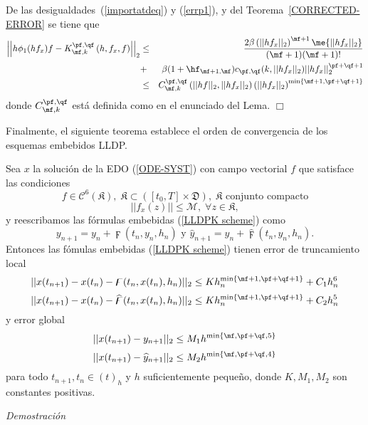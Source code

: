 De las desigualdades~(\ref{importatdeq}) y (\ref{errp1}), y del  Teorema~\ref{CORRECTED-ERROR} se tiene que
\begin{eqnarray*}
\left\lvert\left\lvert  h\phi_1(hf_x)f-  K_{\mf,k}^{\pf,\qf}\left( h,  f_x , f \right)\right\rvert\right\rvert_2
&\leq& \frac{2\beta \left( \vert\lvert hf_x\rvert\rvert_2 \right)^{\mf+1}
    \me{\lvert\lvert hf_x\rvert\rvert_2}}{(\mf+1)(\mf+1)!}\\
&+&
\beta(1+\hf_{\mf+1,\mf})c_{\pf,\qf}(k,\lvert\lvert hf_x \rvert\rvert_2) 
\lvert\lvert hf_x \rvert\rvert_2^{\pf+\qf+1}\\
& \leq &  C_{\mf,k}^{\pf,\qf}\left(\lvert\lvert hf \rvert\rvert_2, \lvert\lvert hf_x \rvert\rvert_2\right)
\left(\lvert\lvert hf_x \rvert\rvert_2\right)^{\mathrm{min}\left\{ \mf+1,\pf+\qf+1 \right\}}
\end{eqnarray*}
donde  $C_{\mf,k}^{\pf,\qf}$ est\'a definida como en el enunciado
del Lema. $\Box$
\newline

Finalmente, el siguiente teorema establece el orden de convergencia de los esquemas embebidos LLDP.

\begin{theorem}\label{Teorema Convergencia}
    Sea $x$ la soluci\'on de la EDO (\ref{ODE-SYST}) con campo vectorial $f$ que satisface las condiciones
    \begin{equation*}
    f\in \mathcal{C}^{6}(\mathfrak{K}) ,\; \mathfrak{K}\subset \left([t_0,T]\times\mathfrak{D}\right),\; \mathfrak{K}\text{ conjunto compacto}
    \end{equation*}
    \begin{equation*}
    ||f_x(z)||\leq \mathcal{M},\; \forall z\in \mathfrak{K},
    \end{equation*}
    y reescribamos las fórmulas embebidas (\ref{LLDPK scheme}) como 
    \[
    y_{n+1}=y_{n}+\digamma (t_{n},y_{n},h_{n})\text{ \ \ \ \ y \ \ \ \ }\widehat{y}%
    _{n+1}=y_{n}+\widehat{\digamma }(t_{n},y_{n},h_{n}).
    \]
 Entonces las fómulas embebidas (\ref{LLDPK scheme}) tienen error de truncamiento local
    \[\lvert\lvert x(t_{n+1}) - x(t_n) - \digamma(t_n,x(t_n),h_n) \rvert\rvert_2 \leq Kh_n^{\mathrm{min}\left\{ \mf+1,\pf+\qf+1  \right\}}+C_1h_n^{6}  \]
    \[\lvert\lvert x(t_{n+1}) - x(t_n) - \widehat{\digamma }(t_n,x(t_n),h_n) \rvert\rvert_2 \leq Kh_n^{\mathrm{min}\left\{ \mf+1,\pf+\qf+1 \right\}}+C_2h_n^{5}  \]
    y error global
    \[ \lvert\lvert x(t_{n+1}) - y_{n+1} \rvert\rvert_2 \leq M_1h^{\mathrm{min}\left\{ \mf,\pf+\qf,5 \right\}} \]
    \[ \lvert\lvert x(t_{n+1}) - \widehat{y}_{n+1} \rvert\rvert_2 \leq M_2h^{\mathrm{min}\left\{ \mf,\pf+\qf,4 \right\}} \]  
    para todo $t_{n+1},t_n\in(t)_h$ y $h$ suficientemente pequeño, donde  $K,M_1,M_2$ son constantes positivas. 
\end{theorem}
\emph{Demostraci\'on} 


